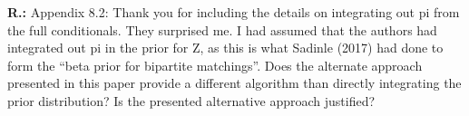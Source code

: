 \documentclass[letterpaper, parskip]{scrartcl}
\newcommand{\pointRaised}[2]{%
	\textbf{#1.\theresponsectr:} #2
}
\newcounter{responsectr}[section]     %
\begin{document}
%	
%


	\pointRaised{R}{%
Appendix 8.2: Thank you for including the details on integrating out pi from the full
conditionals. They surprised me. I had assumed that the authors had integrated out pi in the
prior for Z, as this is what Sadinle (2017) had done to form the “beta prior for bipartite
matchings”. Does the alternate approach presented in this paper provide a different algorithm
than directly integrating the prior distribution? Is the presented alternative approach justified?}
\end{document}
